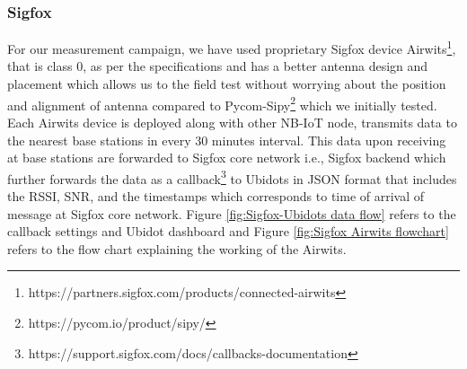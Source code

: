 \documentclass[12pt]{article}
\begin{document}
\subsubsection{Sigfox}\label{sigfox experimental setup}
For our measurement campaign, we have used proprietary Sigfox device Airwits\footnote{https://partners.sigfox.com/products/connected-airwits}, that is class 0, as per the specifications and has a better antenna design and placement which allows us to the field test without worrying about the position and alignment of antenna compared to Pycom-Sipy\footnote{https://pycom.io/product/sipy/} which we initially tested. Each Airwits device is deployed along with other NB-IoT node, transmits data to the nearest base stations in every 30 minutes interval. This data upon receiving at base stations are forwarded to Sigfox core network i.e., Sigfox backend which further forwards the data as a callback\footnote{https://support.sigfox.com/docs/callbacks-documentation} to Ubidots in JSON format that includes the RSSI, SNR, and the timestamps which corresponds to time of arrival of message at Sigfox core network. Figure \ref{fig:Sigfox-Ubidots data flow} refers to the callback settings and Ubidot dashboard and Figure \ref{fig:Sigfox Airwits flowchart} refers to the flow chart explaining the working of the Airwits.
\end{document}
